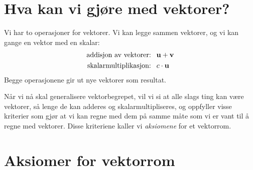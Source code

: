 



\section*{Hva kan vi gjøre med vektorer?}

Vi har to operasjoner for vektorer.  Vi kan legge sammen vektorer, og
vi kan gange en vektor med en skalar:
\begin{align*}
\text{addisjon av vektorer: }&\ \mathbf{u} + \mathbf{v} \\
\text{skalarmultiplikasjon: }&\ c \cdot \mathbf{u}
\end{align*}
Begge operasjonene gir ut nye vektorer som resultat.

Når vi nå skal generalisere vektorbegrepet, vil vi si at alle slags
ting kan være vektorer, så lenge de kan adderes og
skalarmultipliseres, og oppfyller visse kriterier som gjør at vi kan
regne med dem på samme måte som vi er vant til å regne med vektorer.
Disse kriteriene kaller vi \emph{aksiomene} for et vektorrom.


\section*{Aksiomer for vektorrom}


